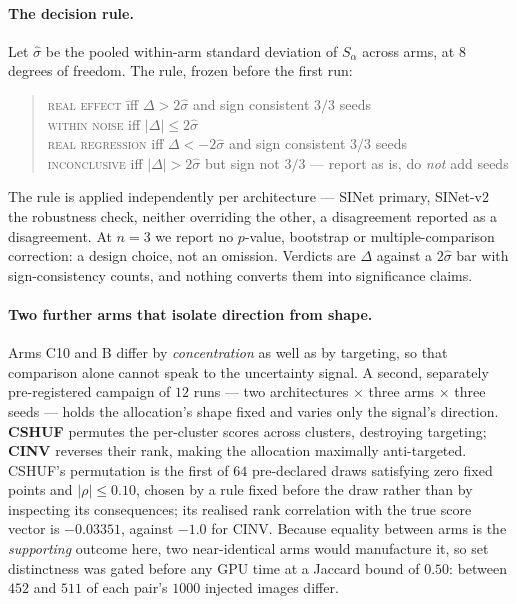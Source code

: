 \documentclass{article} %
\begin{document}
\paragraph{The decision rule.} Let $\hat{\sigma}$ be the pooled within-arm standard deviation of
$S_\alpha$ across arms, at $8$ degrees of freedom. The rule, frozen before the first run:
\begin{quote}
\begin{tabbing}
\textsc{real effect} \quad\= iff $\Delta > 2\hat{\sigma}$ \; and sign consistent $3/3$ seeds \\
\textsc{within noise} \> iff $|\Delta| \leq 2\hat{\sigma}$ \\
\textsc{real regression} \> iff $\Delta < -2\hat{\sigma}$ \; and sign consistent $3/3$ seeds \\
\textsc{inconclusive} \> iff $|\Delta| > 2\hat{\sigma}$ but sign not $3/3$ --- report as is, do
\emph{not} add seeds
\end{tabbing}
\end{quote}
The rule is applied independently per architecture --- SINet primary, SINet-v2 the robustness check,
neither overriding the other, a disagreement reported as a disagreement. At $n = 3$ we report no
$p$-value, bootstrap or multiple-comparison correction: a design choice, not an omission. Verdicts are
$\Delta$ against a $2\hat{\sigma}$ bar with sign-consistency counts, and nothing converts them into
significance claims.

\paragraph{Two further arms that isolate direction from shape.} Arms C10 and B differ by
\emph{concentration} as well as by targeting, so that comparison alone cannot speak to the
uncertainty signal. A second, separately pre-registered campaign of $12$ runs --- two architectures
$\times$ three arms $\times$ three seeds --- holds the allocation's shape fixed and varies only the
signal's direction. \textbf{CSHUF} permutes the per-cluster scores across clusters, destroying
targeting; \textbf{CINV} reverses their rank, making the allocation maximally anti-targeted. CSHUF's
permutation is the first of $64$ pre-declared draws satisfying zero fixed points and
$|\rho| \leq 0.10$, chosen by a rule fixed before the draw rather than by inspecting its
consequences; its realised rank correlation with the true score vector is $-0.03351$, against $-1.0$
for CINV. Because equality between arms is the \emph{supporting} outcome here, two near-identical
arms would manufacture it, so set distinctness was gated before any GPU time at a Jaccard bound of
$0.50$: between $452$ and $511$ of each pair's $1000$ injected images differ.
\end{document}
